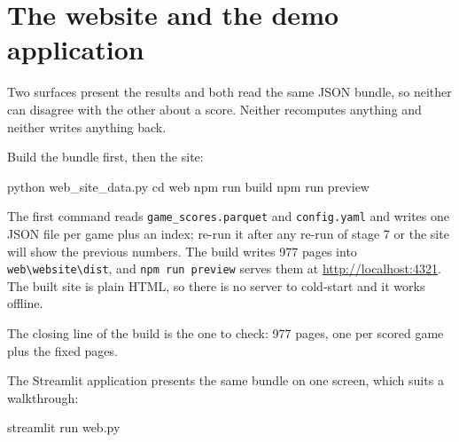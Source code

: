 \section{The website and the demo application}
\label{sec:web}

Two surfaces present the results and both read the same JSON bundle, so neither can disagree with
the other about a score. Neither recomputes anything and neither writes anything back.

Build the bundle first, then the site:

\begin{cmd}
python web\build_site_data.py
cd web\website
npm run build
npm run preview
\end{cmd}

\noindent The first command reads \texttt{game\_scores.parquet} and \texttt{config.yaml} and writes
one JSON file per game plus an index; re-run it after any re-run of stage 7 or the site will show
the previous numbers. The build writes 977 pages into
\texttt{web\textbackslash website\textbackslash dist}, and \texttt{npm run preview} serves them at
\url{http://localhost:4321}. The built site is plain HTML, so there is no server to cold-start and
it works offline.

\noindent The closing line of the build is the one to check: 977 pages, one per scored game plus
the fixed pages.


The Streamlit application presents the same bundle on one screen, which suits a walkthrough:

\begin{cmd}
streamlit run web\app\app.py
\end{cmd}


